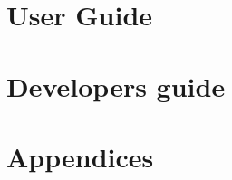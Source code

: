\documentclass[10pt,letter, twopage headsepline]{book}
\begin{document}
  

  \part{User Guide}
    
    
    
    
    
    
    
    
    
    
    

  \part{Developers guide}
    

  \part{Appendices}
    \appendix
    
    

    \cleardoublepage
    
    

    \cleardoublepage
    \printindex
\end{document}
